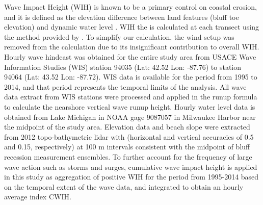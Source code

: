 Wave Impact Height (WIH) is known to be a primary control on coastal erosion,
and it is defined as the elevation difference between land features (bluff toe
elevation) and dynamic water level \citep[water level plus wave runup and wind
setup; ][]{ruggiero_wave_2001,swenson_bluff_2006}. WIH the is calculated at each
transect using the method provided by \citet{swenson_bluff_2006}. To simplify
our calculation, the wind setup was removed from the calculation due to its
insignificant contribution to overall WIH. Hourly wave hindcast was obtained for
the entire study area from USACE Wave Information Studies (WIS) station 94035
(Lat: 42.52 Lon: -87.76) to station 94064 (Lat: 43.52 Lon: -87.72). WIS data is
available for the period from 1995 to 2014, and that period represents the
temporal limits of the analysis. All wave data extract from WIS stations were
processed and applied in the \citet{mase1989random} runup formula to calculate
the nearshore vertical wave runup height. Hourly water level data is obtained
from Lake Michigan in NOAA gage 9087057 in Milwaukee Harbor near the midpoint of
the study area. Elevation data and beach slope were extracted from 2012
topo-bathymetric lidar with (horizontal and vertical accuracies of 0.5 and 0.15,
respectively) at 100 m intervals consistent with the midpoint of bluff recession
measurement ensembles. To further account for the frequency of large wave action
such as storms and surges, cumulative wave impact height
\citet{swenson_bluff_2006} is applied in this study as aggregation of positive
WIH for the period from 1995-2014 based on the temporal extent of the wave data,
and integrated to obtain an hourly average index CWIH. 

